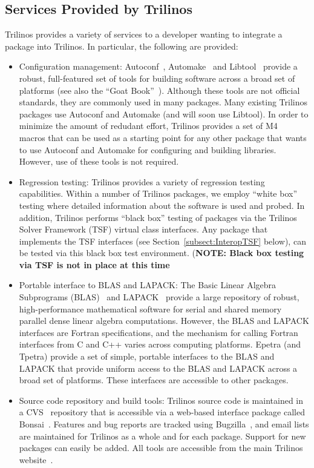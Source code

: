 \documentclass[12pt,relax]{SANDreport}
\begin{document}
\subsection{Services Provided by Trilinos}

Trilinos provides a variety of services to a developer wanting to
integrate a package into Trilinos.  In particular, the following are
provided:
\begin{itemize}
\item Configuration management:
Autoconf~\cite{Autoconf},  Automake~\cite{Automake} and
Libtool~\cite{Libtool} provide a robust, full-featured set of tools for
building software across a broad set of platforms (see also the ``Goat
Book''~\cite{GoatBook}).  Although these
tools are not official standards, they are commonly used in many
packages.  Many existing
Trilinos packages use Autoconf and Automake (and will soon use
Libtool). In order to
minimize the amount of redudant effort, Trilinos provides a set of
M4~\cite{M4} macros that can be used as a starting point for any other
package that wants to use Autoconf and Automake for configuring and
building libraries.  However, use of these tools is not required.

\item Regression testing: Trilinos provides a variety of regression
testing capabilities.  Within a number of Trilinos packages, we employ
``white box'' testing where detailed information about the software is
used and probed.  In addition, Trilinos performs ``black box'' testing
of packages via the Trilinos Solver Framework (TSF) virtual class
interfaces.  Any package that implements the TSF interfaces (see
Section~\ref{subsect:InteropTSF} below), can be tested via this black box
test environment.  ({\bf NOTE: Black box testing via TSF is not in
place at this time}


\item Portable interface to BLAS and LAPACK: The Basic Linear Algebra
Subprograms (BLAS)~\cite{BLAS1,BLAS2,BLAS3} and LAPACK~\cite{lapack}
provide a large repository of robust, high-performance mathematical
software for serial and shared memory parallel dense linear algebra
computations.  However, the BLAS and LAPACK interfaces are Fortran
specifications, and the mechanism for calling Fortran interfaces from
C and C++ varies across computing platforms.  Epetra (and Tpetra)
provide a set of simple, portable interfaces to the BLAS and LAPACK
that provide uniform access to the BLAS and LAPACK across a broad
set of platforms.  These interfaces are accessible to
other packages.

\item Source code repository and build tools: Trilinos source code is
maintained in a CVS~\cite{CVS} repository that is accessible via a
web-based interface package called Bonsai~\cite{Bonsai}.  Features and bug reports
are tracked using Bugzilla~\cite{Bugzilla}, and email lists are
maintained for Trilinos as a whole and for each package.  Support for new
packages can easily be added.  All tools are accessible from the main
Trilinos website~\cite{Trilinos-home-page}.

\end{itemize}
\end{document}
